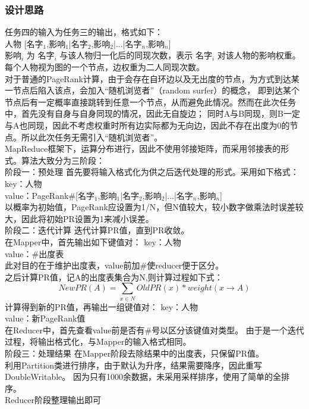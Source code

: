 \documentclass[a4paper,UTF8]{article}
\numberwithin{equation}{section}
\begin{document}
\subsubsection{设计思路}
任务四的输入为任务三的输出，格式如下：\\
人物 [名字$_1$,影响$_1$|名字$_2$,影响$_2$|...|名字$_n$,影响$_n$] \\
影响$_i$ 为 名字$_i$ 与该人物归一化后的同现次数，表示 名字$_i$ 对该人物的影响权重。\\
每个人物视为图的一个节点，边权重为二人同现次数。\\
对于普通的PageRank计算，由于会存在自环边以及无出度的节点，为方式到达某一节点后陷入该点，会加入“随机浏览者”（random surfer）的概念，
即到达某个节点后有一定概率直接跳转到任意一个节点，从而避免此情况。然而在此次任务中，首先没有自身与自身同现的情况，因此无自旋边；
同时A与B同现，则B一定与A也同现，因此不考虑权重时所有边实际都为无向边，因此不存在出度为0的节点。所以此次任务无需引入“随机浏览者”。\\

MapReduce框架下，运算分布进行，因此不使用邻接矩阵，而采用邻接表的形式。算法大致分为三阶段：\\

阶段一：预处理
首先要将输入格式化为供之后迭代处理的形式。采用如下格式：
key：人物\\
value：PageRank\#[名字$_1$,影响$_1$|名字$_2$,影响$_2$|...|名字$_n$,影响$_n$] \\
以概率为初始值，PageRank应设置为1/N，但N值较大，较小数字做乘法时误差较大，因此将初始PR设置为1来减小误差。\\

阶段二：迭代计算
迭代计算PR值，直到PR收敛。\\
在Mapper中，首先输出如下键值对：
key：人物\\
value：\#出度表\\
此对目的在于维护出度表，value前加\#使reducer便于区分。\\
之后计算PR值，记A的出度表集合为N,则计算过程如下式：
$$
NewPR(A)=\sum_{x\in N}OldPR(x)*weight(x\rightarrow A)
$$
计算得到新的PR值，再输出一组键值对：
key：人物\\
value：新PageRank值\\
在Reducer中，首先查看value前是否有\#号以区分该键值对类型。
由于是一个迭代过程，将输出格式化，与Mapper的输入格式相同。\\

阶段三：处理结果
在Mapper阶段去除结果中的出度表，只保留PR值。\\
利用Partition类进行排序，由于默认为升序，结果需要降序，因此重写DoubleWritable。
因为只有1000余数据，未采用采样排序，使用了简单的全排序。\\
Reducer阶段整理输出即可
\end{document}
